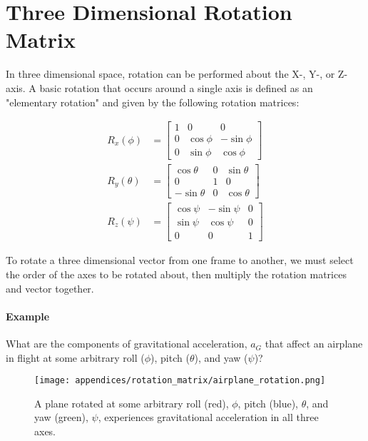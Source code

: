 \section{Three Dimensional Rotation Matrix} 
In three dimensional space, rotation can be performed about the X-, Y-, or Z-axis. A basic rotation that occurs around a single axis is defined as an "elementary rotation" and given by the following rotation matrices:

\begin{align*}
    R_x(\phi) &= \left[
        \begin{matrix}
            1 & 0 & 0 \\
            0 & \cos\phi & -\sin\phi \\
            0 & \sin\phi & \cos\phi
        \end{matrix}
    \right] \\
    R_y(\theta) &= \left[
        \begin{matrix}
            \cos\theta & 0 & \sin\theta \\
            0 & 1 & 0 \\
            -\sin\theta & 0 & \cos\theta
        \end{matrix}
    \right] \\
    R_z(\psi) &= \left[
        \begin{matrix}
            \cos\psi & -\sin\psi & 0 \\
            \sin\psi & \cos\psi & 0 \\
            0 & 0 & 1
        \end{matrix}
    \right]
\end{align*}

To rotate a three dimensional vector from one frame to another, we must select the order of the axes to be rotated about, then multiply the rotation matrices and vector together.
\paragraph*{Example} What are the components of gravitational acceleration, $a_G$ that affect an airplane in flight at some arbitrary roll ($\phi$), pitch ($\theta$), and yaw ($\psi$)?

\begin{figure}[h!]
    \caption{A plane rotated at some arbitrary roll (red), $\phi$, pitch (blue), $\theta$, and yaw (green), $\psi$, experiences gravitational acceleration in all three axes.}
    \centering
    \texttt{[image: appendices/rotation\_matrix/airplane\_rotation.png]}
\end{figure}

